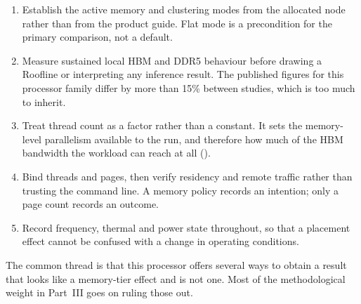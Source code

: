\begin{enumerate}
  \item Establish the active memory and clustering modes from the
        allocated node rather than from the product guide.  Flat mode is
        a precondition for the primary comparison, not a default.
  \item Measure sustained local HBM and DDR5 behaviour before drawing a
        Roofline or interpreting any inference result.  The published
        figures for this processor family differ by more than 15\%
        between studies, which is too much to inherit.
  \item Treat thread count as a factor rather than a constant.  It sets
        the memory-level parallelism available to the run, and therefore
        how much of the HBM bandwidth the workload can reach at all
        ().
  \item Bind threads and pages, then verify residency and remote traffic
        rather than trusting the command line.  A memory policy records
        an intention; only a page count records an outcome.
  \item Record frequency, thermal and power state throughout, so that a
        placement effect cannot be confused with a change in operating
        conditions.
\end{enumerate}

The common thread is that this processor offers several ways to obtain a
result that looks like a memory-tier effect and is not one.  Most of the
methodological weight in Part~III goes on ruling those out.
